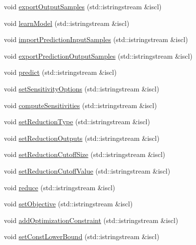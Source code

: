 \begin{DoxyCompactItemize}
\item 
void \hyperlink{class_go_s_u_m_1_1_c_script_a3f76c8c705bfcc7c5e6deb93403f3e5d}{export\-Output\-Samples} (std\-::istringstream \&iscl)
\item 
void \hyperlink{class_go_s_u_m_1_1_c_script_aaffbacef5bb3b80fd9f487f784b98673}{learn\-Model} (std\-::istringstream \&iscl)
\item 
void \hyperlink{class_go_s_u_m_1_1_c_script_abc13faf84a2eb8776ca16f166d650959}{import\-Prediction\-Input\-Samples} (std\-::istringstream \&iscl)
\item 
void \hyperlink{class_go_s_u_m_1_1_c_script_a765f8e1412dcf451c538b205cbb9b1e8}{export\-Prediction\-Output\-Samples} (std\-::istringstream \&iscl)
\item 
void \hyperlink{class_go_s_u_m_1_1_c_script_a35a8adf25da2fb8dd139ba9e25dcfaa1}{predict} (std\-::istringstream \&iscl)
\item 
void \hyperlink{class_go_s_u_m_1_1_c_script_a2ab05e665020cf4f694c77fad4aa0305}{set\-Sensitivity\-Options} (std\-::istringstream \&iscl)
\item 
void \hyperlink{class_go_s_u_m_1_1_c_script_a4c87c55b67a31c0519e8ce81f4d53d6b}{compute\-Sensitivities} (std\-::istringstream \&iscl)
\item 
void \hyperlink{class_go_s_u_m_1_1_c_script_aaa8c188490fc770831f85859cbff2d20}{set\-Reduction\-Type} (std\-::istringstream \&iscl)
\item 
void \hyperlink{class_go_s_u_m_1_1_c_script_a7d4221d7057203491f5438a373d497b4}{set\-Reduction\-Outputs} (std\-::istringstream \&iscl)
\item 
void \hyperlink{class_go_s_u_m_1_1_c_script_a0ede9b035ac834704173b29128740467}{set\-Reduction\-Cutoff\-Size} (std\-::istringstream \&iscl)
\item 
void \hyperlink{class_go_s_u_m_1_1_c_script_a7ac7512269145c4860882664527fe649}{set\-Reduction\-Cutoff\-Value} (std\-::istringstream \&iscl)
\item 
void \hyperlink{class_go_s_u_m_1_1_c_script_af9dc9d620d750be5592dd6ee21b0069d}{reduce} (std\-::istringstream \&iscl)
\item 
void \hyperlink{class_go_s_u_m_1_1_c_script_af28286a54873ea654c468b76b0209fad}{set\-Objective} (std\-::istringstream \&iscl)
\item 
void \hyperlink{class_go_s_u_m_1_1_c_script_a5ad6edee53cc37c7ac31c51a7da11646}{add\-Optimization\-Constraint} (std\-::istringstream \&iscl)
\item 
void \hyperlink{class_go_s_u_m_1_1_c_script_a9726d3533bd28e2563929054d2d5cc4c}{set\-Const\-Lower\-Bound} (std\-::istringstream \&iscl)

\end{DoxyCompactItemize}
